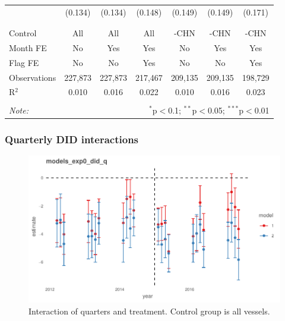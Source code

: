 \documentclass[11pt,english]{article}
\begin{document}
\begin{table}[!htbp]
\begin{tabular}{@{\extracolsep{1pt}}lcccccc}
  & (0.134) & (0.134) & (0.148) & (0.149) & (0.149) & (0.171) \\ 
  & & & & & & \\ 
\hline \\[-1.8ex] 
Control & All & All & All & -CHN & -CHN & -CHN \\ 
Month FE & No & Yes & Yes & No & Yes & Yes \\ 
Flag FE & No & No & Yes & No & No & Yes \\ 
Observations & 227,873 & 227,873 & 217,467 & 209,135 & 209,135 & 198,729 \\ 
R$^{2}$ & 0.010 & 0.016 & 0.022 & 0.010 & 0.016 & 0.023 \\ 
\hline 
\hline \\[-1.8ex] 
\textit{Note:}  & \multicolumn{6}{r}{$^{*}$p$<$0.1; $^{**}$p$<$0.05; $^{***}$p$<$0.01} \\ 
\end{tabular} 
\end{table}

\clearpage

\hypertarget{quarterly-did-interactions}{%
\subsubsection{Quarterly DID
interactions}\label{quarterly-did-interactions}}

\begin{figure}
\centering
\includegraphics{Manuscript_files/figure-latex/unnamed-chunk-20-1.pdf}
\caption{\label{fig:unnamed-chunk-20}\label{fig:q1}Interaction of quarters
and treatment. Control group is all vessels.}
\end{figure}
\end{document}
